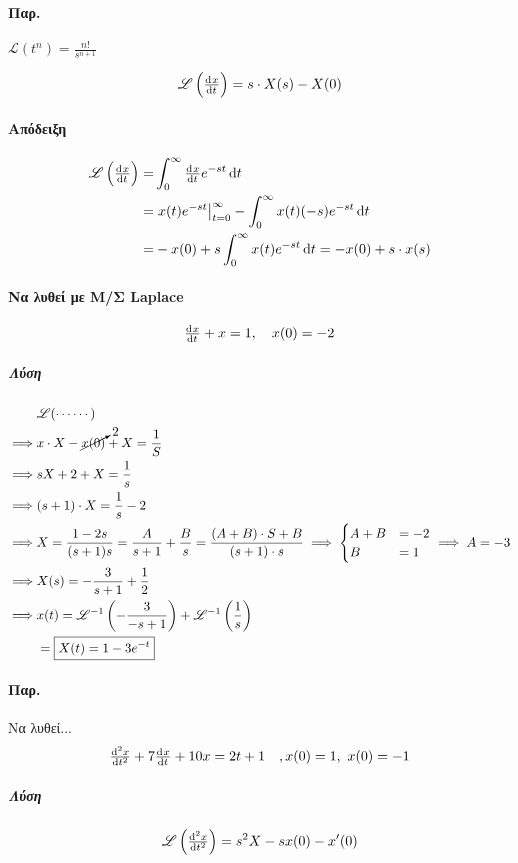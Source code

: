 \documentclass[11pt,a4paper,titlepage,final]{article}
\begin{document}
\paragraph{Παρ.}
\(
\mathscr{L}(t^n) = \frac{n!}{s^{n+1}}
\)

\begin{theorem*}{}
\[
\mathscr{L}\left(
\od{x}{t}
\right)
= s\cdot X(s)-X(0)
\]
\end{theorem*}
\paragraph{Απόδειξη}
\begin{align*}
\mathscr{L}\left(
\od{x}{t}
\right) =& \int_0^\infty\od{x}{t} e^{-st}\dif t
\\ =&
\left.x(t)e^{-st}\right|_{t=0}^\infty - \int_0^\infty x(t)(-s)e^{-st} \dif t
\\=&
-x(0)+s\int_0^\infty x(t)e^{-st}\dif t = -x(0)+s\cdot x(s)
\end{align*}

\paragraph{Να λυθεί με Μ/Σ \textlatin{Laplace}}
\[
\od{x}{t}+x=1,\quad x(0)=-2
\]
\subparagraph{Λύση}
\begin{align*}
&\mathscr{L}(\cdots\cdots) \\
\implies&
x\cdot X-\cancelto{2}{x(0)}+X=\frac{1}{S}
\\ \implies &
sX+2+X=\frac{1}{s}
\\ \implies &
(s+1)\cdot X=\frac{1}{s}-2
\\ \implies &
X=\frac{1-2s}{(s+1)s}=\frac{A}{s+1}+\frac{B}{s}=\frac{(A+B)\cdot S +B}{(s+1)\cdot s}
\implies \begin{cases}
A+B&=-2\\
B&=1
\end{cases}\implies A=-3
\\ \implies &
X(s) = -\frac{3}{s+1}+\frac{1}{2}
\\ \implies &
x(t)=\mathscr{L}^{-1}\left(
-\frac{3}{-s+1}
\right)+\mathscr{L}^{-1}\left(
\frac{1}{s}
\right)
\\ &=
\boxed{
X(t)=1-3e^{-t}
}
\end{align*}

\paragraph{Παρ.}
Να λυθεί...
\[
\od[2]{x}{t}+7\od{x}{t}+10x=2t+1\quad ,x(0)=1,\ x(0)=-1
\]
\subparagraph{Λύση}
\begin{align*}
\mathscr{L}\left(
\od[2]{x}{t}
\right)=s^2X-sx(0)-x'(0)
\end{align*}
\end{document}
